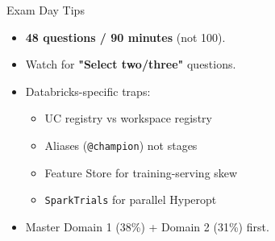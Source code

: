 \documentclass[aspectratio=169,9pt]{beamer}
\begin{document}
	\begin{frame}{Exam Day Tips}
		\begin{itemize}
			\item \textbf{48 questions / 90 minutes} (not 100).
			\item Watch for \textbf{"Select two/three"} questions.
			\item Databricks-specific traps:
			\begin{itemize}
				\item UC registry vs workspace registry
				\item Aliases (\texttt{@champion}) not stages
				\item Feature Store for training-serving skew
				\item \texttt{SparkTrials} for parallel Hyperopt
			\end{itemize}
			\item Master Domain 1 (38\%) + Domain 2 (31\%) first.
		\end{itemize}
	\end{frame}
	
\end{document}
